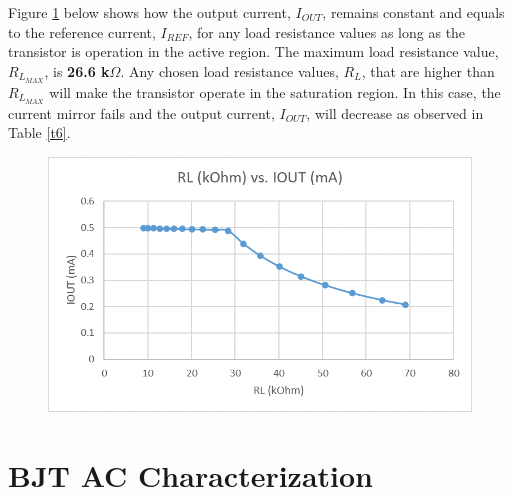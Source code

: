 \documentclass{article}
\begin{document}
	\pagebreak
	
	\noindent Figure \ref{f20} below shows how the output current, $I_{OUT}$, remains constant and equals to the reference current, $I_{REF}$, for any load resistance values as long as the transistor is operation in the active region.
	The maximum load resistance value, $R_{L_{MAX}}$, is \textbf{26.6 k$\Omega$}.
	Any chosen load resistance values, $R_L$, that are higher than $R_{L_{MAX}}$ will make the transistor operate in the saturation region.
	In this case, the current mirror fails and the output current, $I_{OUT}$, will decrease as observed in Table \ref{t6}.
	
	\begin{figure}[!ht]
		\centering
		\includegraphics[width=0.8\linewidth]{iout_vs_rl_1_1_npnp.png}
		\label{f20}
	\end{figure}
	
	\pagebreak
	
	\section{BJT AC Characterization}
\end{document}
